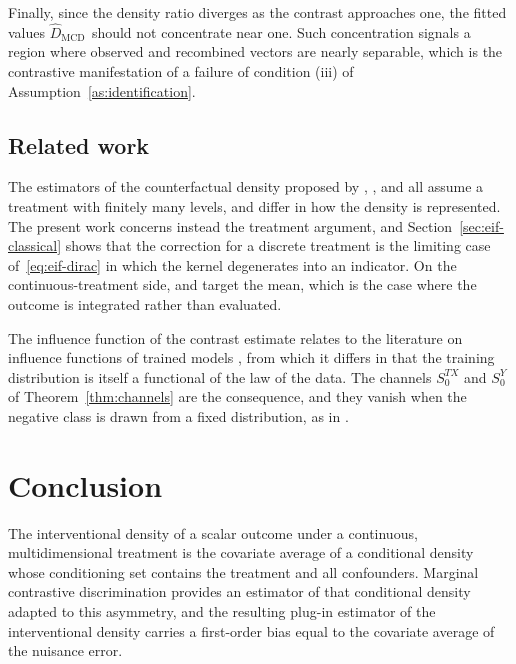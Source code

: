 \documentclass[11pt]{article}
\theoremstyle{plain}
\theoremstyle{definition}
\theoremstyle{remark}
\newcommand{\mcd}{\text{MCD}\,}
\newcommand{\contrasthat}{\widehat{D}_{\mcd}}
\newcommand{\score}{S}
\begin{document}
Finally, since the density ratio diverges as the contrast approaches one, the fitted
values $\contrasthat$ should not concentrate near one. Such concentration signals a
region where observed and recombined vectors are nearly separable, which is the
contrastive manifestation of a failure of condition (iii) of
Assumption~\ref{as:identification}.

\subsection{Related work}
\label{sec:discussion-lit}

The estimators of the counterfactual density proposed by \citet{kennedy2023density},
\citet{melnychuk2023flows}, \citet{ham2024logconcave} and \citet{martinez2023stein} all
assume a treatment with finitely many levels, and differ in how the density is
represented. The present work concerns instead the treatment argument, and
Section~\ref{sec:eif-classical} shows that the correction for a discrete treatment is the
limiting case of~\eqref{eq:eif-dirac} in which the kernel degenerates into an indicator.
On the continuous-treatment side, \citet{kennedy2017continuous} and \citet{colangelo2020}
target the mean, which is the case where the outcome is integrated rather than evaluated.

The influence function of the contrast estimate relates to the literature on influence
functions of trained models \citep{avella2017,kohliang2017,basu2021,bae2022}, from which
it differs in that the training distribution is itself a functional of the law of the
data. The channels $\score_0^{TX}$ and $\score_0^{Y}$ of Theorem~\ref{thm:channels} are
the consequence, and they vanish when the negative class is drawn from a fixed
distribution, as in \citet{gutmann2010nce}.

\section{Conclusion}
\label{sec:conclusion}

The interventional density of a scalar outcome under a continuous, multidimensional
treatment is the covariate average of a conditional density whose conditioning set
contains the treatment and all confounders. Marginal contrastive discrimination provides
an estimator of that conditional density adapted to this asymmetry, and the resulting
plug-in estimator of the interventional density carries a first-order bias equal to the
covariate average of the nuisance error.
\end{document}
